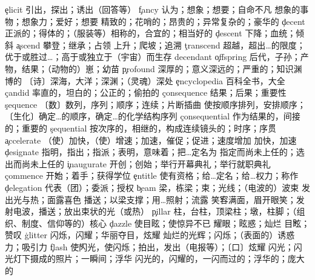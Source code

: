 \begin{multicols}{2}
\c{elicit}  \vt 引出，探出；诱出（回答等）
\c{fancy}  \vt 认为；想象；想要；自命不凡 \n 想象的事物；想象力；爱好；想要 \a 精致的；花哨的；昂贵的；异常复杂的；豪华的
\c{decent}  \a 正派的；得体的；（服装等）相称的，合宜的；相当好的
\c{descent}  \n 下降；血统；倾斜
\c{ascend}  \vt 攀登；继承；占领 \vi 上升；爬坡；追溯
\c{transcend}  \vt 超越，超出…的限度；优于或胜过…；高于或独立于（宇宙）而生存
decendant
\c{offspring}  \n 后代，子孙；产物，结果；（动物的）崽；幼苗
\c{profound}  \a 深厚的；意义深远的；严重的；知识渊博的 \n 〔诗〕深海，大洋；深渊；（灵魂）深处
\c{encyclopedia}  \n 百科全书，大全
\c{candid}  \a 率直的，坦白的；公正的；偷拍的
\c{consequence}  \n 结果；后果；重要性
\c{sequence}  \n 〔数〕数列，序列；顺序；连续；片断插曲 \vt 使按顺序排列，安排顺序；〔生化〕确定…的顺序，确定…的化学结构序列
\c{consequential}  \a 作为结果的，间接的；重要的
\c{sequential}  \a 按次序的，相继的，构成连续镜头的；时序；序贯
\c{accelerate}  \vt （使）加快，（使）增速；加速，催促；促进；速度增加 \vi 加快，加速
\c{designate}  \vt 指明，指出；指派；表明，意味着；把…定名为 \a 指定而尚未上任的；选出而尚未上任的 
\c{inaugurate}  \vt 开创；创始；举行开幕典礼；举行就职典礼
\c{commence}  \v 开始；着手；获得学位
\c{entitle}  \vt 使有资格；给…定名；给…权力；称作 
\c{delegation}  \n 代表（团）；委派；授权
\c{beam}  \n 梁，栋梁；束；光线；（电波的）波束 \vi 发出光与热；面露喜色 \vt 播送；以梁支撑；用…照射；流露 \v 笑容满面，眉开眼笑；发射电波，播送；放出束状的光（或热）
\c{pillar}  \n 柱，台柱，顶梁柱；墩，柱脚；（组织、制度、信仰等的）核心
\c{dazzle}  \vt 使目眩；使惊异不已 \n 耀眼；眩惑；灿烂 \v 目眩；赞叹
\c{glitter}  \vi 闪烁，闪耀；华丽夺目，炫耀 \n 灿烂的光辉；闪烁；（表面的）诱惑力；吸引力 
\c{flash}  \v 使闪光，使闪烁；拍出，发出（电报等）；〔口〕炫耀 \n 闪光；闪光灯下摄成的照片；一瞬间；浮华 \a 闪光的，闪耀的，一闪而过的；浮华的；庞大的

\end{multicols}
